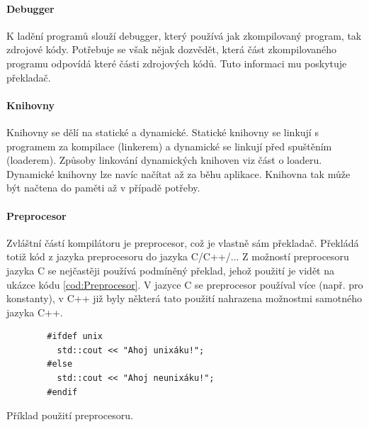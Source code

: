 \paragraph{Debugger}
K ladění programů slouží debugger, který používá jak zkompilovaný program, tak zdrojové kódy. Potřebuje se však nějak dozvědět, která část zkompilovaného programu odpovídá které části zdrojových kódů. Tuto informaci mu poskytuje překladač.

\paragraph{Knihovny}
Knihovny se dělí na statické a dynamické. Statické knihovny se linkují s programem za kompilace (linkerem) a dynamické se linkují před spuštěním (loaderem). Způsoby linkování dynamických knihoven viz část o loaderu. Dynamické knihovny lze navíc načítat až za běhu aplikace. Knihovna tak může být načtena do paměti až v případě potřeby.

\paragraph{Preprocesor}
Zvláštní částí kompilátoru je preprocesor, což je vlastně sám překladač. Překládá totiž kód z jazyka preprocesoru do jazyka C/C++/... Z možností preprocesoru jazyka C se nejčastěji používá podmíněný překlad, jehož použití je vidět na ukázce kódu \ref{cod:Preprocesor}. V jazyce C se preprocesor používal více (např. pro konstanty), v C++ již byly některá tato použití nahrazena možnostmi samotného jazyka C++.
\begin{kod}[h]
	\begin{verbatim}
		#ifdef unix
		  std::cout << "Ahoj unixáku!";
		#else
		  std::cout << "Ahoj neunixáku!";
		#endif
	\end{verbatim}
	\caption{Příklad použití preprocesoru.}
	\label{cod:Preprocesor}
\end{kod}


